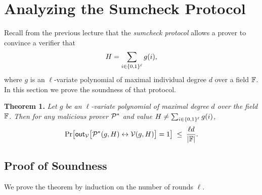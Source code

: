 \documentclass[11pt]{article}
\begin{document}
\section{Analyzing the Sumcheck Protocol}

Recall from the previous lecture that the \emph{sumcheck protocol} allows a prover to convince a verifier that
\[
  H = \sum_{i \in \{0,1\}^\ell} g(i),
\]
where $g$ is an $\ell$-variate polynomial of maximal individual degree $d$ over a field $\mathbb{F}$.  In this section we prove the soundness of that protocol.

\begin{tcolorbox}[colback=blue!5!white, colframe=blue!60!black, fonttitle=\bfseries,
                  title={Theorem (Soundness of Sumcheck)}]
\textbf{Theorem 1.}
\textit{Let $g$ be an $\ell$-variate polynomial of maximal degree $d$ over the field $\mathbb{F}$.
Then for any malicious prover $\mathcal{P}^*$ and value $H \neq \sum_{i \in \{0,1\}^\ell} g(i)$,}
\[
  \Pr\!\left[\mathsf{out}_{\mathcal{V}}\bigl[\mathcal{P}^*(g, H) \leftrightarrow \mathcal{V}(g, H)\bigr] = 1\right]
  \;\le\;
  \frac{\ell d}{|\mathbb{F}|}.
\]
\end{tcolorbox}

\subsection{Proof of Soundness}

We prove the theorem by induction on the number of rounds $\ell$.
\end{document}
